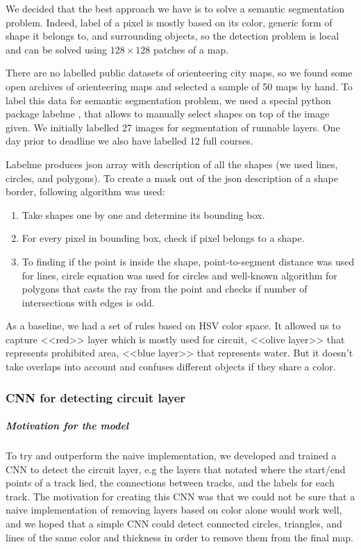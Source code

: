 \documentclass[a4paper,12pt]{extarticle}
\begin{document}
We decided that the best approach we have is to solve a semantic segmentation problem.
Indeed, label of a pixel is mostly based on its color, generic form of shape it belongs to, and surrounding objects, so the detection problem is local and can be solved using $128 \times 128$ patches of a map.

There are no labelled public datasets of orienteering city maps, so we found some open archives of orienteering maps and selected a sample of 50 maps by hand.
To label this data for semantic segmentation problem, we used a special python package labelme \cite{labelme}, that allows to manually select shapes on top of the image given.
We initially labelled 27 images for segmentation of runnable layers. One day prior to deadline we also have labelled 12 full courses.

Labelme produces json array with description of all the shapes (we used lines, circles, and polygons).
To create a mask out of the json description of a shape border, following algorithm was used:
\begin{enumerate}
    \item Take shapes one by one and determine its bounding box.
    \item For every pixel in bounding box, check if pixel belongs to a shape.
    \item To finding if the point is inside the shape, point-to-segment distance was used for lines, circle equation was used for circles and well-known algorithm for polygons \cite{pipproblem} that casts the ray from the point and checks if number of intersections with edges is odd.
\end{enumerate}

As a baseline, we had a set of rules based on HSV color space.
It allowed us to capture <<red>> layer which is mostly used for circuit, <<olive layer>> that represents prohibited area, <<blue layer>> that represents water.
But it doesn't take overlaps into account and confuses different objects if they share a color.

\subsubsection{CNN for detecting circuit layer}
\subparagraph{Motivation for the model\\}

To try and outperform the naive implementation, we developed and trained a CNN \cite{cnn} to detect the circuit layer, e.g the layers that notated where the start/end points of a track lied, the connections between tracks, and the labels for each track.
The motivation for creating this CNN was that we could not be sure that a naive implementation of removing layers based on color alone would work well, and we hoped that a simple CNN could detect connected circles, triangles, and lines of the same color and thickness in order to remove them from the final map. 
\end{document}
